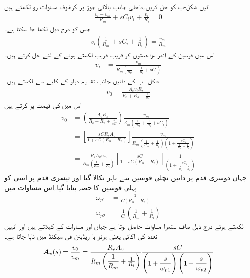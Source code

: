 آئیں شکل-ب کو حل کریں۔داخلی جانب بالائی جوڑ پر کرخوف مساوات رو لکھتے ہیں
\begin{align*}
\frac{v_i-v_m}{R_m}+sC_i v_i+\frac{v_i}{R_i}=0
\end{align*}
جس کو درج ذیل لکھا جا سکتا ہے۔
\begin{align*}
v_i\left(\frac{1}{R_m}+s C_i+\frac{1}{R_i}\right)=\frac{v_m}{R_m}
\end{align*}
اس میں قوسین کے اندر مزاحمتوں کو قریب قریب لکھتے ہوئے   کے لئے حل کرتے ہیں۔
\begin{align*}
v_i&=\frac{v_m}{R_m\left(\frac{1}{R_m}+\frac{1}{R_i}+s C_i\right)}
\end{align*}
شکل -ب کے دائیں جانب تقسیم دباو کے کلیے سے  لکھتے ہیں۔
\begin{align*}
v_0=\frac{A_v v_i R_s}{R_o+R_s+\frac{1}{s C}}
\end{align*}
اس میں  کی قیمت پر کرتے ہیں
\begin{align*}
v_0&=\left(\frac{A_v R_s}{R_o+R_s+\frac{1}{sC}}\right)\frac{v_m}{R_m\left(\frac{1}{R_m}+\frac{1}{R_i}+s C_i\right)}\\
&=\left[\frac{sC R_s A_v}{1+sC(R_o+R_s)}\right]\frac{v_m}{R_m\left(\frac{1}{R_m}+\frac{1}{R_i}\right)\left(1+\frac{s C_i}{\frac{1}{R_m}+\frac{1}{R_i}}\right)}\\
&=\frac{R_s A_v v_m}{R_m\left(\frac{1}{R_m}+\frac{1}{R_i}\right)}\left[\frac{sC}{1+sC(R_o+R_s)}\right]\frac{1}{\left(1+\frac{s C_i}{\frac{1}{R_m}+\frac{1}{R_i}}\right)}
\end{align*}
جہاں دوسری قدم پر دائیں نچلی قوسین سے  باہر نکالا گیا اور تیسری قدم پر اسی کو پہلی قوسین کا حصہ بنایا گیا۔اس مساوات میں
\begin{align*}
\omega_{p1}&=\frac{1}{C(R_o+R_s)}\\
\omega_{p2}&=\frac{1}{C_i}\left(\frac{1}{R_m}+\frac{1}{R_i}\right)
\end{align*}
لکھتے ہوئے درج ذیل صاف ستھرا مساوات حاصل ہوتا ہے جہاں  اور  مساوات کے    کہلاتے ہیں اور انہیں تعدد کی اکائی یعنی ہرٹز  یا ریڈیئن فی سیکنڈ  میں ناپا جاتا ہے۔
\begin{align}
{\ensuremath{{\boldsymbol{A}}}}_v(s)=\frac{v_0}{v_m}=\dfrac{R_s A_v }{R_m\left(\dfrac{1}{R_m}+\frac{1}{R_i}\right)}\dfrac{sC}{\left(1+\dfrac{s}{\omega_{p1}}\right)\left(1+\dfrac{s}{\omega_{p2}}\right)}
\end{align}
